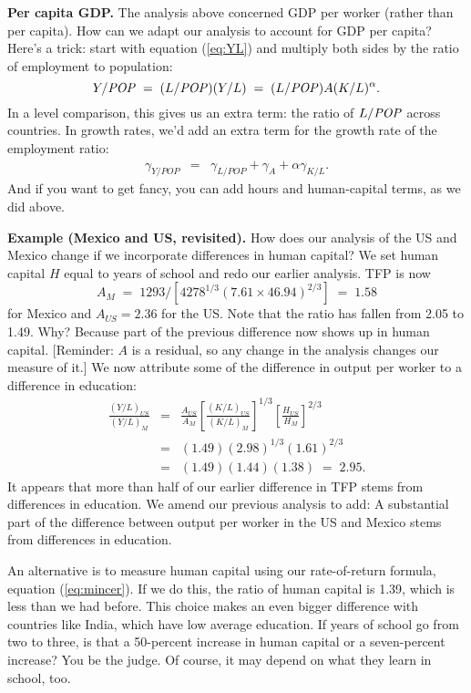 \textbf{Per capita GDP.} The analysis above concerned GDP per worker (rather than per capita).
How can we adapt our analysis to account for GDP per capita?
Here's a trick:
start with equation (\ref{eq:YL}) and multiply both sides by
the ratio of employment to population:
\[
    Y/\mbox{\em POP\/} \;=\; (L/\mbox{\em POP\/}) (Y/L) \;=\; (L/\mbox{\em POP\/}) A (K/L)^\alpha .
\]
In a level comparison, this gives us an extra term:  the ratio
of $L/\mbox{\em POP\/}$ across countries.
In growth rates, we'd add an extra term for the growth rate of
the employment ratio:
\begin{eqnarray*}
    \gamma_{Y/POP} &=&  \gamma_{L/POP}  + \gamma_A
                + \alpha \gamma_{K/L}  .
\end{eqnarray*}
And if you want to get fancy, you can add hours and human-capital terms,
as we did above.


\textbf{Example (Mexico and US, revisited).}
How does our analysis of the US and Mexico change if
we incorporate differences in human capital?
We set human capital $H$ equal to years of school
and redo our earlier analysis.
TFP is now
\[
    A_M \;=\; 1293 / [ 4278^{1/3} (7.61 \times 46.94)^{2/3} ] \;=\; 1.58
\]
for Mexico and $A_{US} = 2.36$ for the US.
Note that the ratio has fallen from 2.05 to 1.49.
Why?  Because part of the previous difference
now shows up in human capital.
[Reminder:  $A$ is a residual, so
any change in the analysis changes our measure of it.]
We now attribute some of the difference in output per worker
to a difference in education:
\begin{eqnarray*}
     \frac{(Y/L)_{US}}{(Y/L)_{M}}  &=&  \frac{A_{US}}{A_M}
                        \left[ \frac{(K/L)_{US}}{(K/L)_{M}} \right]^{1/3}
                        \left[ \frac{H_{US}}{H_M} \right]^{2/3}_{\phantom{X_X}}   \\
                         &=&   (1.49) (2.98)^{1/3} (1.61)^{2/3}  \\%
                         &=&   (1.49) (1.44) (1.38) \;=\; 2.95 . %
\end{eqnarray*}
It appears that more than half of our earlier difference in TFP
stems from differences in education.
We amend our previous analysis to add:
A substantial part of the difference between output per worker
in the US and Mexico stems from differences in education.

An alternative is to measure human capital using our
rate-of-return formula, equation (\ref{eq:mincer}).
If we do this, the ratio of human capital is 1.39,
which is less than we had before.
This choice makes an even bigger difference with countries
like India, which have low average education.
If years of school go from two to three, is that a 50-percent increase
in human capital or a seven-percent increase?
You be the judge.
Of course, it may depend on what they learn in school, too.


